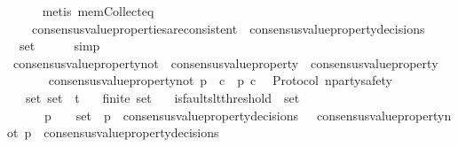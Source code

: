 \begin{isabellebody}
\ \ \ \ \isamarkupfalse%
\ {\isacharparenleft}metis\ mem{\isacharunderscore}Collect{\isacharunderscore}eq{\isacharparenright}\isanewline
\ \ \isamarkupfalse%
\isanewline
\ \ \ \ {\isachardoublequoteopen}consensus{\isacharunderscore}value{\isacharunderscore}properties{\isacharunderscore}are{\isacharunderscore}consistent\ {\isacharparenleft}{\isasymUnion}\ {\isacharbraceleft}consensus{\isacharunderscore}value{\isacharunderscore}property{\isacharunderscore}decisions\ {\isasymsigma}\ {\isacharbar}\ {\isasymsigma}{\isachardot}\ {\isasymsigma}\ {\isasymin}\ {\isasymsigma}{\isacharunderscore}set{\isacharbraceright}{\isacharparenright}{\isachardoublequoteclose}\isanewline
\ \ \ \ \isamarkupfalse%
\ simp\isanewline
{}\isamarkupfalse%
%
\endisatagproof
{\isafoldproof}%
%
\isadelimproof
\isanewline
%
\endisadelimproof
\isanewline
{}\isamarkupfalse%
\ consensus{\isacharunderscore}value{\isacharunderscore}property{\isacharunderscore}not\ {\isacharcolon}{\isacharcolon}\ {\isachardoublequoteopen}consensus{\isacharunderscore}value{\isacharunderscore}property\ {\isasymRightarrow}\ consensus{\isacharunderscore}value{\isacharunderscore}property{\isachardoublequoteclose}\isanewline
\ \ \isanewline
\ \ \ \ {\isachardoublequoteopen}consensus{\isacharunderscore}value{\isacharunderscore}property{\isacharunderscore}not\ p\ {\isacharequal}\ {\isacharparenleft}{\isasymlambda}c{\isachardot}\ {\isacharparenleft}{\isasymnot}\ p\ c{\isacharparenright}{\isacharparenright}{\isachardoublequoteclose}\isanewline
\isanewline
{}\isamarkupfalse%
\ {\isacharparenleft}\ Protocol{\isacharparenright}\ n{\isacharunderscore}party{\isacharunderscore}safety\ {\isacharcolon}\isanewline
\ \ {\isachardoublequoteopen}{\isasymforall}\ {\isasymsigma}{\isacharunderscore}set{\isachardot}\ {\isasymsigma}{\isacharunderscore}set\ {\isasymsubseteq}\ {\isasymSigma}t\isanewline
\ \ {\isasymlongrightarrow}\ finite\ {\isasymsigma}{\isacharunderscore}set\isanewline
\ \ {\isasymlongrightarrow}\ is{\isacharunderscore}faults{\isacharunderscore}lt{\isacharunderscore}threshold\ {\isacharparenleft}{\isasymUnion}\ {\isasymsigma}{\isacharunderscore}set{\isacharparenright}\isanewline
\ \ {\isasymlongrightarrow}\ {\isacharparenleft}{\isasymforall}\ {\isasymsigma}\ {\isasymsigma}{\isacharprime}\ p{\isachardot}\ {\isacharbraceleft}{\isasymsigma}{\isacharcomma}\ {\isasymsigma}{\isacharprime}{\isacharbraceright}\ {\isasymsubseteq}\ {\isasymsigma}{\isacharunderscore}set\ {\isasymand}\ p\ {\isasymin}\ consensus{\isacharunderscore}value{\isacharunderscore}property{\isacharunderscore}decisions\ {\isasymsigma}\ {\isasymlongrightarrow}\ consensus{\isacharunderscore}value{\isacharunderscore}property{\isacharunderscore}not\ p\ {\isasymnotin}\ consensus{\isacharunderscore}value{\isacharunderscore}property{\isacharunderscore}decisions\ {\isasymsigma}{\isacharprime}{\isacharparenright}{\isachardoublequoteclose}\isanewline

\end{isabellebody}

